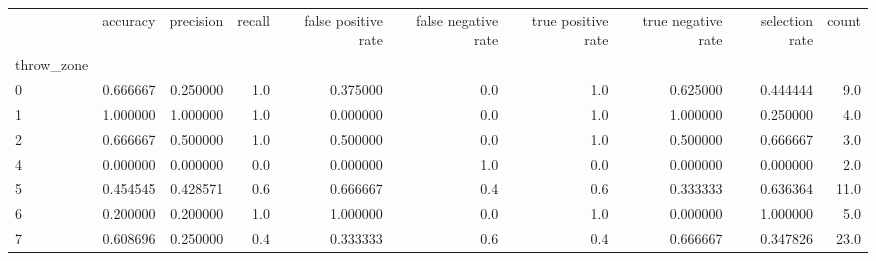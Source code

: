 \begin{tabular}{lrrrrrrrrr}
\toprule
{} &  accuracy &  precision &  recall &  false positive rate &  false negative rate &  true positive rate &  true negative rate &  selection rate &  count \\
throw\_zone &           &            &         &                      &                      &                     &                     &                 &        \\
\midrule
0          &  0.666667 &   0.250000 &     1.0 &             0.375000 &                  0.0 &                 1.0 &            0.625000 &        0.444444 &    9.0 \\
1          &  1.000000 &   1.000000 &     1.0 &             0.000000 &                  0.0 &                 1.0 &            1.000000 &        0.250000 &    4.0 \\
2          &  0.666667 &   0.500000 &     1.0 &             0.500000 &                  0.0 &                 1.0 &            0.500000 &        0.666667 &    3.0 \\
4          &  0.000000 &   0.000000 &     0.0 &             0.000000 &                  1.0 &                 0.0 &            0.000000 &        0.000000 &    2.0 \\
5          &  0.454545 &   0.428571 &     0.6 &             0.666667 &                  0.4 &                 0.6 &            0.333333 &        0.636364 &   11.0 \\
6          &  0.200000 &   0.200000 &     1.0 &             1.000000 &                  0.0 &                 1.0 &            0.000000 &        1.000000 &    5.0 \\
7          &  0.608696 &   0.250000 &     0.4 &             0.333333 &                  0.6 &                 0.4 &            0.666667 &        0.347826 &   23.0 \\
\bottomrule
\end{tabular}
